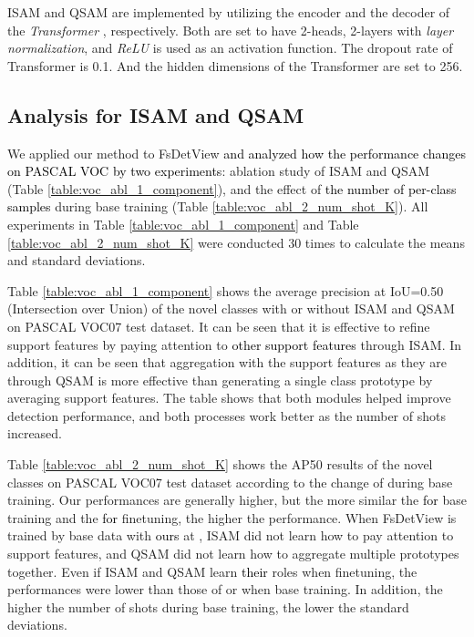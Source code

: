 \documentclass[10pt,twocolumn,letterpaper]{article}
\newcommand{\nj}[1]{\textcolor{black}{#1}}
\begin{document}
ISAM and QSAM are implemented by utilizing the encoder and the decoder of the \textit{Transformer} \cite{vaswani2017attention}, respectively. Both are set to have 2-heads, 2-layers with \textit{layer normalization}, and \textit{ReLU} is used as an activation function. The dropout \cite{srivastava2014dropout} rate of Transformer is 0.1. And the hidden dimensions of the Transformer are set to 256.



\subsection{Analysis for ISAM and QSAM}
\label{subsec:ablation}
We applied our method to FsDetView \cite{xiao2020few} \nj{and analyzed how the performance changes on PASCAL VOC by two experiments}: ablation study of ISAM and QSAM (Table \ref{table:voc_abl_1_component}), and the effect of \nj{the number of per-class samples } during base training (Table \ref{table:voc_abl_2_num_shot_K}). All experiments in Table \ref{table:voc_abl_1_component} and Table \ref{table:voc_abl_2_num_shot_K} were conducted 30 times to calculate the means and standard deviations.

\vspace{+0.15cm}
\quad 
Table \ref{table:voc_abl_1_component} shows the average precision at IoU=0.50 (Intersection over Union) of the novel classes with or without ISAM and QSAM on PASCAL VOC07 test dataset. It can be seen that it is effective to refine support features by paying attention to \nj{other support features} through ISAM. In addition, it can be seen that aggregation with the support features as they are through QSAM is more effective than generating a single class prototype by averaging support features. The table shows that both modules helped improve detection performance, and both processes work better as the number of shots  increased.

\vspace{+0.15cm}
\noindent{}{\bf The number of \nj{shots}  during base training}\quad Table \ref{table:voc_abl_2_num_shot_K} shows the AP50 results of the novel classes on PASCAL VOC07 test dataset according to the change of  during base training. Our performances are generally higher, but the more similar the  \nj{for} base training and the  \nj{for} finetuning, the higher the performance. When FsDetView is trained by base data with \nj{ours} at , ISAM did not learn how to pay attention to support features, and QSAM did not learn how to aggregate multiple prototypes together. Even if ISAM and QSAM learn \nj{their} roles when finetuning, the performances were lower than those of  or  when base training. In addition, the higher the number of shots during base training, the lower the standard deviations.
\end{document}
